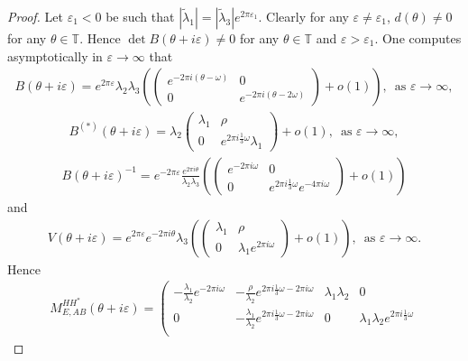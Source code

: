 \documentclass[11pt]{amsart}
\newcommand{\T}{\mathbb T}
\begin{document}
\begin{proof}
Let $\varepsilon_1<0$ be such that $|\tilde{\lambda}_1|=|\tilde{\lambda}_3|e^{2\pi \varepsilon_1}$. Clearly for any $\varepsilon\neq \varepsilon_1$, $d(\theta)\neq 0$ for any $\theta\in \T$. 
Hence $\det B(\theta+i\varepsilon)\neq 0$ for any $\theta\in \T$ and $\varepsilon>\varepsilon_1$. 
One computes asymptotically in $\varepsilon\to\infty$ that 
    \begin{align}
B(\theta+i\varepsilon)=e^{2\pi\varepsilon}\lambda_2\lambda_3\left(\left(\begin{matrix}
        e^{-2\pi i(\theta-\omega)} &0\\
        0 &e^{-2\pi i(\theta-2\omega)}
        \end{matrix}\right)+o(1)\right),\, \text{ as } \varepsilon\to \infty, 
    \end{align}
\begin{align}
    B^{(*)}(\theta+i\varepsilon)=\lambda_2\left(\begin{matrix}\lambda_1 & \rho\\ 0 &e^{2\pi i\frac{1}{3}\omega}\lambda_1
    \end{matrix}\right)+o(1),\, \text{ as } \varepsilon\to \infty, 
\end{align}
\begin{align}
    B(\theta+i\varepsilon)^{-1}=e^{-2\pi\varepsilon}\frac{e^{2\pi i\theta}}{\lambda_2\lambda_3}\left(\left(\begin{matrix}
        e^{-2\pi i\omega} &0\\
        0 &e^{2\pi i\frac{1}{3}\omega} e^{-4\pi i\omega}
    \end{matrix}\right)+o(1)\right)
\end{align}
    and 
    \begin{align}
V(\theta+i\varepsilon)=e^{2\pi\varepsilon}e^{-2\pi i\theta}\lambda_3\left(\left(\begin{matrix}
    \lambda_1 & \rho\\
    0 & \lambda_1 e^{2\pi i \omega}
\end{matrix}\right)+o(1)\right),\, \text{ as } \varepsilon\to\infty.
    \end{align}
Hence
\begin{align}
    M_{E,AB}^{HH^*}(\theta+i\varepsilon)=\left(\begin{matrix} 
    -\frac{\lambda_1}{\lambda_2}e^{-2\pi i\omega} &-\frac{\rho}{\lambda_2}e^{2\pi i \frac{1}{3}\omega-2\pi i\omega} &\lambda_1\lambda_2 &0\\
    0 &-\frac{\lambda_1}{\lambda_2}e^{2\pi i \frac{1}{3}\omega-2\pi i\omega} &0 &\lambda_1\lambda_2 e^{2\pi i\frac{1}{3}\omega}\\

\end{matrix}
\end{align}
\end{proof}
\end{document}
